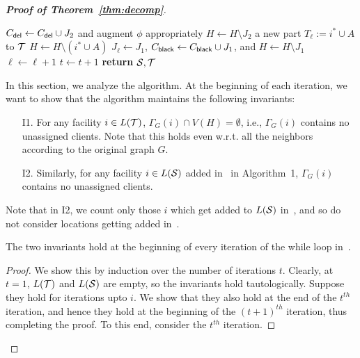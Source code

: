 \begin{proof}[{\bf Proof of Theorem~\ref{thm:decomp}}]
\begin{algorithm}
\begin{algorithmic}[1]
\State $C_{\mathsf{del}} \gets C_{\mathsf{del}} \cup J_2$ and augment $\phi$ appropriately  \label{alg:phi2}
\State $H \gets H \setminus J_2$
 a new part $T_\ell := i^* \cup A$ to ${\cal T}$  \label{alg:case2b}
\State $H \gets H \setminus (i^* \cup A)$ 
\State $J_\ell \gets J_1$, $C_{\mathsf{black}} \gets C_{\mathsf{black}} \cup J_1$, and $H \gets H \setminus J_1$  \label{alg:color2}
\State $\ell \gets \ell + 1$
\EndIf
\State $t \gets t+1 $ 
\EndWhile\label{euclidendwhile}
\State \textbf{return} ${\cal S},{\cal T}$
\EndProcedure
\end{algorithmic}
\end{algorithm}

In this section, we analyze the algorithm. 
\medskip \noindent
At the beginning of each iteration, we want to show that the algorithm maintains the following invariants:
\begin{framed}
\begin{enumerate}%
	\item[I1.] For any facility $i\in L({\cal T})$, $\Gamma_G(i) \cap V(H) = \emptyset$, i.e., $\Gamma_G(i)$  contains no unassigned clients. Note that this holds even w.r.t. all the neighbors according to the original graph $G$.
\item[I2.] Similarly, for any facility $i \in L({\cal S})$  added in~ in Algorithm~1, $\Gamma_G(i)$ contains no unassigned clients.
\end{enumerate}
\end{framed}
Note that in I2, we count only those $i$ which get added to $L({\cal S})$ in~, and so do not consider locations getting added in~. 

\begin{claim}
\label{cl:inv}
The two invariants hold at the beginning of every iteration of the while loop in~.
\end{claim}
\begin{proof}
We show this by induction over the number of iterations $t$. Clearly, at $t=1$, $L({\cal T})$ and $L({\cal S})$ are empty, so the invariants hold tautologically. Suppose they hold for iterations upto $i$. We show that they also hold at the end of the $t^{th}$ iteration, and hence they hold at the beginning of the $(t+1)^{th}$ iteration, thus completing the proof. To this end, consider the $t^{th}$ iteration.


\end{proof}
\end{proof}
